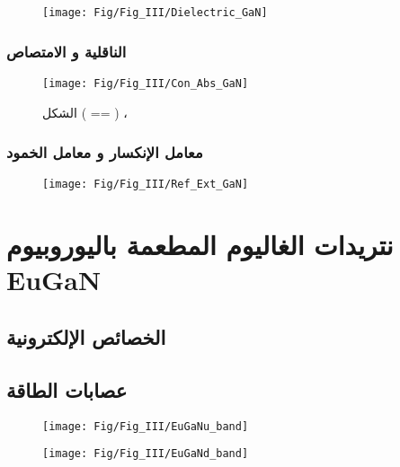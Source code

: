 \begin{figure}[h!]
	\centering
	\texttt{[image: Fig/Fig\_III/Dielectric\_GaN]}
	\caption{}
	\label{fig:dielectricgan}
\end{figure}
\FloatBarrier

\subsubsection{الناقلية و الامتصاص}

\begin{figure}[h!]
	\centering
	\texttt{[image: Fig/Fig\_III/Con\_Abs\_GaN]}
	\caption{}الشكل ( == ) ، 
	\label{fig:conabsgan}
\end{figure}
\FloatBarrier

\subsubsection{معامل الإنكسار و معامل الخمود}

\begin{figure}[h!]
	\centering
	\texttt{[image: Fig/Fig\_III/Ref\_Ext\_GaN]}
	\caption{}
	\label{fig:refextgan}
\end{figure}
\FloatBarrier

\section{  نتريدات الغاليوم المطعمة باليوروبيوم EuGaN }
\subsection{الخصائص الإلكترونية }

\subsection*{عصابات الطاقة}

\begin{figure}[h!]
	\centering
	\texttt{[image: Fig/Fig\_III/EuGaNu\_band]}
	\caption{}
	\label{fig:euganuband}
\end{figure}
\FloatBarrier
\begin{figure}[h!]
	\centering
	\texttt{[image: Fig/Fig\_III/EuGaNd\_band]}
	\caption{}
	\label{fig:euganuband}
\end{figure}
\FloatBarrier
